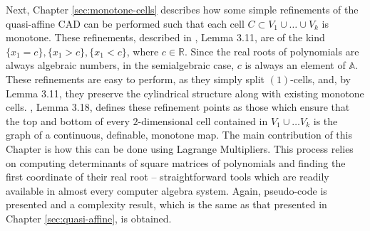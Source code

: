 \documentclass[
]{book}
\theoremstyle{definition}
\theoremstyle{definition}
\theoremstyle{definition}
\theoremstyle{definition}
\theoremstyle{remark}
\begin{document}
Next, Chapter \ref{sec:monotone-cells} describes how some simple refinements of the quasi-affine CAD can be performed such that each cell \(C \subset V_1 \cup \ldots \cup V_k\) is monotone. These refinements, described in \citet{bgv15}, Lemma 3.11, are of the kind \(\{ x_1 = c \}, \{ x_1 > c \}, \{ x_1 < c \}\), where \(c \in \mathbb{R}\). Since the real roots of polynomials are always algebraic numbers, in the semialgebraic case, \(c\) is always an element of \(\mathbb{A}\). These refinements are easy to perform, as they simply split \((1)\)-cells, and, by \citet{bgv15} Lemma 3.11, they preserve the cylindrical structure along with existing monotone cells.
\citet{bgv15}, Lemma 3.18, defines these refinement points as those which ensure that the top and bottom of every \(2\)-dimensional cell contained in \(V_1\cup \ldots V_k\) is the graph of a continuous, definable, monotone map. The main contribution of this Chapter is how this can be done using Lagrange Multipliers. This process relies on computing determinants of square matrices of polynomials and finding the first coordinate of their real root -- straightforward tools which are readily available in almost every computer algebra system.
Again, pseudo-code is presented and a complexity result, which is the same as that presented in Chapter \ref{sec:quasi-affine}, is obtained.
\end{document}
